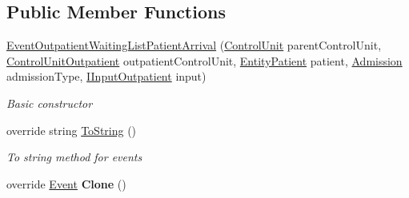 \subsection*{Public Member Functions}
\begin{DoxyCompactItemize}
\item 
\hyperlink{class_general_health_care_elements_1_1_department_models_1_1_outpatient_1_1_waiting_list_1_1_eveb69cba3dbb99690008a282b7e42002d2_ac830b101d51897da8203ab8bafcfdb2f}{Event\+Outpatient\+Waiting\+List\+Patient\+Arrival} (\hyperlink{class_simulation_core_1_1_h_c_c_m_elements_1_1_control_unit}{Control\+Unit} parent\+Control\+Unit, \hyperlink{class_general_health_care_elements_1_1_department_models_1_1_outpatient_1_1_control_unit_outpatient}{Control\+Unit\+Outpatient} outpatient\+Control\+Unit, \hyperlink{class_general_health_care_elements_1_1_entities_1_1_entity_patient}{Entity\+Patient} patient, \hyperlink{class_general_health_care_elements_1_1_treatment_admission_types_1_1_admission}{Admission} admission\+Type, \hyperlink{interface_general_health_care_elements_1_1_department_models_1_1_outpatient_1_1_i_input_outpatient}{I\+Input\+Outpatient} input)
\begin{DoxyCompactList}\small\item\em Basic constructor \end{DoxyCompactList}\item 
override string \hyperlink{class_general_health_care_elements_1_1_department_models_1_1_outpatient_1_1_waiting_list_1_1_eveb69cba3dbb99690008a282b7e42002d2_a8897f9f45cfaa9405a3167954b04339e}{To\+String} ()
\begin{DoxyCompactList}\small\item\em To string method for events \end{DoxyCompactList}\item 
override \hyperlink{class_simulation_core_1_1_h_c_c_m_elements_1_1_event}{Event} {\bfseries Clone} ()\hypertarget{class_general_health_care_elements_1_1_department_models_1_1_outpatient_1_1_waiting_list_1_1_eveb69cba3dbb99690008a282b7e42002d2_ad70422f19a6fe86a1e1452909e0a8994}{}\label{class_general_health_care_elements_1_1_department_models_1_1_outpatient_1_1_waiting_list_1_1_eveb69cba3dbb99690008a282b7e42002d2_ad70422f19a6fe86a1e1452909e0a8994}

\end{DoxyCompactItemize}
